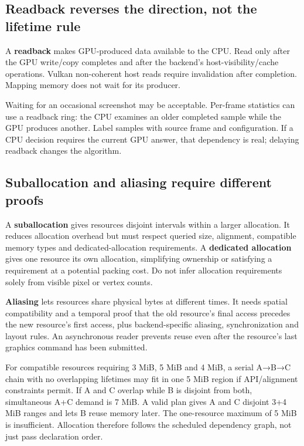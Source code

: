 \subsection{Readback reverses the direction, not the lifetime rule}\label{03-visual-computing-i-ch016-readback-reverses-the-direction-not-the-lifetime-rule}

A \textbf{readback} makes GPU-produced data available to the CPU. Read only after the GPU write/copy completes and after the backend's host-visibility/cache operations. Vulkan non-coherent host reads require invalidation after completion. Mapping memory does not wait for its producer.

Waiting for an occasional screenshot may be acceptable. Per-frame statistics can use a readback ring: the CPU examines an older completed sample while the GPU produces another. Label samples with source frame and configuration. If a CPU decision requires the current GPU answer, that dependency is real; delaying readback changes the algorithm.

\subsection{Suballocation and aliasing require different proofs}\label{03-visual-computing-i-ch016-suballocation-and-aliasing-require-different-proofs}

A \textbf{suballocation} gives resources disjoint intervals within a larger allocation. It reduces allocation overhead but must respect queried size, alignment, compatible memory types and dedicated-allocation requirements. A \textbf{dedicated allocation} gives one resource its own allocation, simplifying ownership or satisfying a requirement at a potential packing cost. Do not infer allocation requirements solely from visible pixel or vertex counts.

\textbf{Aliasing} lets resources share physical bytes at different times. It needs spatial compatibility and a temporal proof that the old resource's final access precedes the new resource's first access, plus backend-specific aliasing, synchronization and layout rules. An asynchronous reader prevents reuse even after the resource's last graphics command has been submitted.

For compatible resources requiring 3 MiB, 5 MiB and 4 MiB, a serial A→B→C chain with no overlapping lifetimes may fit in one 5 MiB region if API/alignment constraints permit. If A and C overlap while B is disjoint from both, simultaneous A+C demand is 7 MiB. A valid plan gives A and C disjoint 3+4 MiB ranges and lets B reuse memory later. The one-resource maximum of 5 MiB is insufficient. Allocation therefore follows the scheduled dependency graph, not just pass declaration order.

